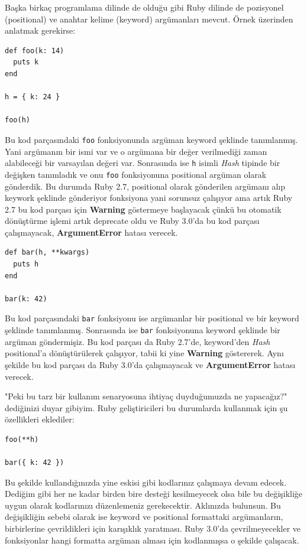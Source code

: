 \documentclass[11pt]{article}
\begin{document}
Başka birkaç programlama dilinde de olduğu gibi Ruby dilinde de pozisyonel
(positional) ve anahtar kelime (keyword) argümanları mevcut. Örnek üzerinden
anlatmak gerekirse:
\begin{verbatim}
def foo(k: 14)
  puts k
end

h = { k: 24 }

foo(h)
\end{verbatim}
Bu kod parçasındaki \texttt{foo} fonksiyonunda argüman keyword şeklinde tanımlanmış.
Yani argümanın bir ismi var ve o argümana bir değer verilmediği zaman
alabileceği bir varsayılan değeri var. Sonrasında ise \texttt{h} isimli \emph{Hash}
tipinde bir değişken tanımladık ve onu \texttt{foo} fonksiyonuna positional argüman
olarak gönderdik. Bu durumda Ruby 2.7, positional olarak gönderilen argümanı
alıp keywork şeklinde gönderiyor fonksiyona yani sorunsuz çalışıyor ama artık
Ruby 2.7 bu kod parçası için \textbf{Warning} göstermeye başlayacak çünkü bu otomatik
dönüştürme işlemi artık deprecate oldu ve Ruby 3.0'da bu kod parçası
çalışmayacak, \textbf{ArgumentError} hatası verecek.
\begin{verbatim}
def bar(h, **kwargs)
  puts h
end

bar(k: 42)
\end{verbatim}
Bu kod parçasındaki \texttt{bar} fonksiyonu ise argümanlar bir positional ve bir
keyword şeklinde tanımlanmış. Sonrasında ise \texttt{bar} fonksiyonuna keyword
şeklinde bir argüman göndermişiz. Bu kod parçası da Ruby 2.7'de, keyword'den
\emph{Hash} positional'a dönüştürülerek çalışıyor, tabii ki yine \textbf{Warning}
göstererek. Aynı şekilde bu kod parçası da Ruby 3.0'da çalışmayacak ve
\textbf{ArgumentError} hatası verecek.

"Peki bu tarz bir kullanım senaryosuna ihtiyaç duyduğumuzda ne yapacağız?"
dediğinizi duyar gibiyim. Ruby geliştiricileri bu durumlarda kullanmak için şu
özellikleri eklediler:
\begin{verbatim}
foo(**h)

bar({ k: 42 })
\end{verbatim}
Bu şekilde kullandığınızda yine eskisi gibi kodlarınız çalışmaya devam edecek.
Dediğim gibi her ne kadar birden bire desteği kesilmeyecek olsa bile bu
değişikliğe uygun olarak kodlarınızı düzenlemeniz gerekecektir. Aklınızda
bulunsun. Bu değişikliğin sebebi olarak ise keyword ve positional formattaki
argümanların, birbirlerine çevrildikleri için karışıklık yaratması. Ruby
3.0'da çevrilmeyecekler ve fonksiyonlar hangi formatta argüman alması için
kodlanmışsa o şekilde çalışacak.
\end{document}
